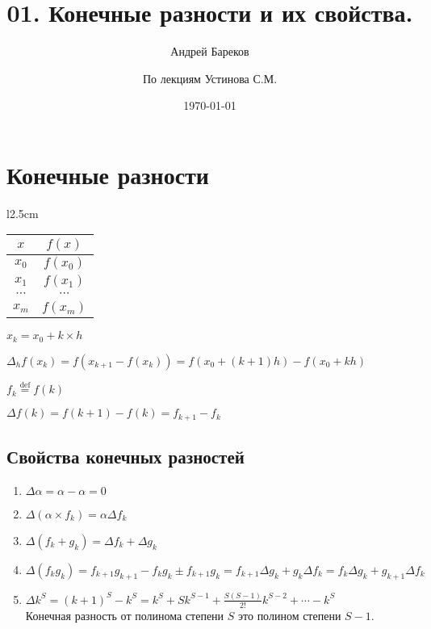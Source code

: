 \documentclass[a4paper,11pt]{article}
\title{01. Конечные разности и их свойства.}
\author{Андрей Бареков \and По лекциям Устинова С.М.}
\date{\today}
\begin{document}
\maketitle
\newpage

\section{Конечные разности}
\begin{wraptable}{l}{2.5cm}
  \begin{tabular}{ c|c }
    $x$ & $f(x)$ \\
    \hline
    $x_0$ & $f(x_0)$ \\
    $x_1$ & $f(x_1)$ \\
    $\cdots$ & $\cdots$ \\
    $x_m$ & $f(x_m)$
  \end{tabular}
  \vspace{3mm}
  \(x_k = x_0 + k \times h\)
\end{wraptable}

\(\Delta_h f(x_k) = f(x_{k+1} - f(x_k)) = f(x_0 + (k+1)h) - f(x_0 + kh)\)

\begin{center}
  \(f_k \stackrel{\mathrm{def}}{=} f(k)\)
\end{center}

\(\Delta f(k) = f(k+1) - f(k) = f_{k+1} - f_k\)

\vspace{1.2cm}
  \subsection{Свойства конечных разностей}
  \begin{enumerate}
    \item \(\Delta \alpha = \alpha - \alpha = 0\)
    \item \(\Delta (\alpha \times f_k) = \alpha \Delta f_k\)
    \item \(\Delta (f_k + g_k) = \Delta f_k + \Delta g_k\)
    \item \(\Delta (f_k g_k) = f_{k+1} g_{k+1} - f_k g_k \pm f_{k+1} g_k
        = f_{k+1} \Delta g_k + g_k \Delta f_k = f_k \Delta g_k + g_{k+1} \Delta f_k\)
    \item \(\Delta k^S = (k+1)^S - k^S = k^S + Sk^{S-1} + \frac{S(S-1)}{2!}k^{S-2} + \cdots - k^S\) \\
        Конечная разность от полинома степени $S$ это полином степени $S-1$.
  \end{enumerate}
\end{document}
